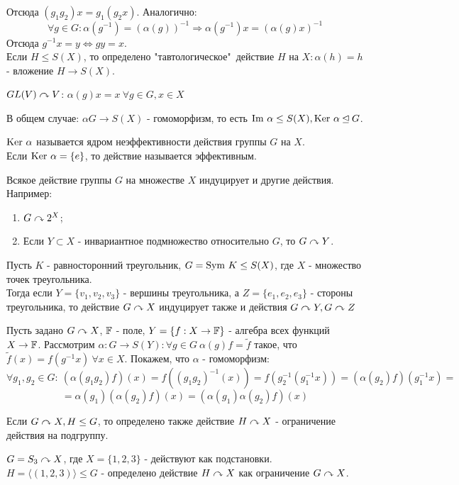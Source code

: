 Отсюда $(g_1g_2)x = g_1(g_2x)$. Аналогично:
\[\forall g \in G: \alpha(g^{-1}) = (\alpha(g))^{-1} \Longrightarrow \alpha(g^{-1})x = (\alpha(g)x)^{-1}\]
Отсюда $g^{-1}x = y \Longleftrightarrow gy = x$.\\
Если $H \leq S(X)$, то определено "тавтологическое"\  действие $H$ на $X: \alpha(h) = h$ - вложение $H \rightarrow S(X)$.
\begin{example}
    $GL(V) \curvearrowright V$: $\alpha(g)x = x \ \forall g \in G, x \in X$
\end{example}
В общем случае: $\alpha G \rightarrow S(X)$ - гомоморфизм, то есть $\textup{Im }\alpha \leq S(X), \textup{Ker }\alpha \unlhd G$.
\begin{definition}
    $\textup{Ker }\alpha$ называется ядром неэффективности действия группы $G$ на $X$.\\
    Если $\textup{Ker }\alpha = \{e\}$, то действие называется эффективным.
\end{definition}
\begin{remark}
    Всякое действие группы $G$ на множестве $X$ индуцирует и другие действия. Например:
    \begin{enumerate}
        \item $G \curvearrowright 2^X$;
        \item Если $Y \subset X$ - инвариантное подмножество относительно $G$, то $G \curvearrowright Y$. 
    \end{enumerate}
\end{remark}
\begin{example}
    Пусть $K$ - равносторонний треугольник, $G = \textup{Sym }K \leq S(X)$, где $X$ - множество точек треугольника.\\
    Тогда если $Y = \{v_1, v_2, v_3\}$ - вершины треугольника, а $Z = \{e_1, e_2, e_3\}$ - стороны треугольника, то действие $G \curvearrowright X$ индуцирует также и действия $G \curvearrowright Y, G \curvearrowright Z$
\end{example}
\begin{example}
    Пусть задано $G \curvearrowright X$, $\mathbb{F}$ - поле, $Y = \{f: X \rightarrow \mathbb{F}\}$ - алгебра всех функций $X \rightarrow \mathbb{F}$. Рассмотрим $\alpha: G \rightarrow S(Y): \forall g \in G \ \alpha(g)f = \tilde{f}$ такое, что $\tilde{f}(x) = f(g^{-1}x) \ \forall x \in X$. Покажем, что $\alpha$ - гомоморфизм:
    \[\forall g_1, g_2 \in G: \ (\alpha(g_1g_2)f)(x) = f((g_1g_2)^{-1}(x)) = f(g_2^{-1}(g_1^{-1}x)) = (\alpha(g_2)f)(g_1^{-1}x) =\]
    \[= \alpha(g_1)(\alpha(g_2)f)(x) = (\alpha(g_1)\alpha(g_2)f)(x)\]
\end{example}
\begin{remark}
    Если $G \curvearrowright X, H \leq G$, то определено также действие $H\curvearrowright X$ - ограничение действия на подгруппу.
\end{remark}
\begin{example}
    $G = S_3 \curvearrowright X$, где $X = \{1, 2, 3\}$ - действуют как подстановки.\\
    $H = \langle (1, 2, 3) \rangle \leq G$ - определено действие $H \curvearrowright X$ как ограничение $G \curvearrowright X$.
\end{example}
